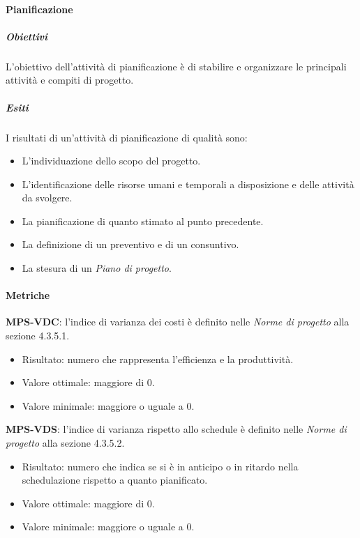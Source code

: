 \documentclass[../piano-di-qualifica.tex]{subfiles}
\begin{document}
\paragraph{Pianificazione}%
\label{par:pianificazione}

\subparagraph{Obiettivi}%
\label{subp:obiettivi_pers}
L'obiettivo dell'attività di pianificazione è di stabilire e organizzare le principali attività e compiti di progetto.

\subparagraph{Esiti}%
\label{subp:esiti_pers}
I risultati di un'attività di pianificazione di qualità sono:
\begin{itemize}
  \item L'individuazione dello scopo del progetto.
  \item L'identificazione delle risorse umani e temporali a disposizione e delle attività da svolgere.
  \item La pianificazione di quanto stimato al punto precedente.
  \item La definizione di un preventivo e di un consuntivo.
  \item La stesura di un \textit{Piano di progetto}.
\end{itemize}

\paragraph{Metriche}%
\label{par:metriche_pers}

\textbf{MPS-VDC}: l'indice di varianza dei costi è definito nelle \textit{Norme di progetto} alla sezione 4.3.5.1.
\begin{itemize}
  \item Risultato: numero che rappresenta l'efficienza e la produttività.
  \item Valore ottimale: maggiore di 0.
  \item Valore minimale: maggiore o uguale a 0.
\end{itemize}

\textbf{MPS-VDS}: l'indice di varianza rispetto allo schedule è definito nelle \textit{Norme di progetto} alla sezione 4.3.5.2.
\begin{itemize}
  \item Risultato: numero che indica se si è in anticipo o in ritardo nella schedulazione rispetto a quanto pianificato.
  \item Valore ottimale: maggiore di 0.
  \item Valore minimale: maggiore o uguale a 0.
\end{itemize}
\end{document}
